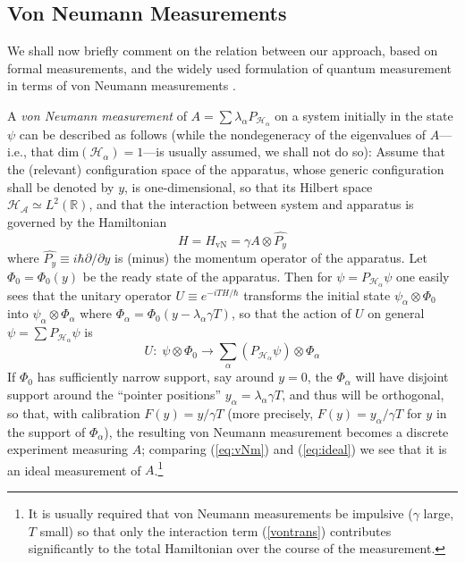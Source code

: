 \documentclass[12pt]{article}
\newcommand{\eq}[1]{(\ref{#1})}
\renewcommand{\a}{\alpha}
\newcommand{\la}{\lambda_{\a}}
\newcommand{\ot}{\otimes}
\newcommand{\Phia}{\Phi_{\a}}
\newcommand{\Ha}{{\H}_{\a}}
\renewcommand{\H}{\mbox{$\mathcal{H}$}}
\newcommand{\Pa}{ P_{ {\mathcal{H}_{\a} } } }
\newcommand{\R}{\mathbb{R}}
\begin{document}
\subsection{Von Neumann Measurements}
\label{sec:vNM}

We shall now briefly comment on the relation between our approach,
based on formal measurements, and the widely used formulation of
quantum measurement in terms of von Neumann measurements \cite{vNe55}.

A {\it von Neumann measurement\/} of $A=\sum \la \Pa $ on a system
initially in the state $\psi$ can be described as follows (while the
nondegeneracy of the eigenvalues of $A$---i.e., that
$\mbox{dim}(\Ha)=1$---is usually assumed, we shall not do so): Assume
that the (relevant) configuration space of the apparatus, whose
generic configuration shall be denoted by $y$, is one-dimensional, so
that its Hilbert space $\H_{\mathcal{A}}\simeq L^{2}(\R)$, and that
the interaction between system and apparatus is governed by the
Hamiltonian
\begin{equation}
H= H_{\text{vN}}= \gamma A\otimes \hat{P_{y}}
\label{vontrans}
\end{equation}
where $\hat{P_{y}}\equiv i\hbar\partial/\partial y$ is (minus) the
momentum operator of the apparatus.  Let $\Phi_0 = \Phi_0 (y) $ be the
ready state of the apparatus.  Then for $\psi=\Pa\psi$ one easily sees
that the unitary operator $U\equiv e^{-i TH/\hbar}$ transforms the
initial state $\psi_\a \ot \Phi_0$ into $ \psi _\a \ot \Phia$ where
$\Phia = \Phi_{0}(y - \la\gamma T)$, so that the action of $U$ on
general $\psi =\sum \Pa \psi$ is
\begin{equation}
U: \;\psi \ot \Phi_0  \to
\sum_{\a} (\Pa\psi) \ot \Phia
\label{eq:vNm}
\end{equation}
If $\Phi_{0}$ has sufficiently narrow support, say around $y=0$, the
$\Phia$ will have disjoint support around the ``pointer positions''
$y_\a = \la\gamma T$, and thus will be orthogonal, so that, with
calibration $F(y)= y /\gamma T$ (more precisely, $F(y)= y_\a /\gamma
T$ for $y$ in the support of $\Phi_\a$), the resulting von Neumann
measurement becomes a discrete experiment measuring $A$; comparing
(\ref{eq:vNm}) and (\ref{eq:ideal}) we see that it is an ideal
measurement of $A$.\footnote{It is usually required that von Neumann
   measurements be impulsive ($\gamma$ large, $T$ small) so that only
   the interaction term \eq{vontrans} contributes significantly to the
   total Hamiltonian over the course of the measurement.}
\end{document}

